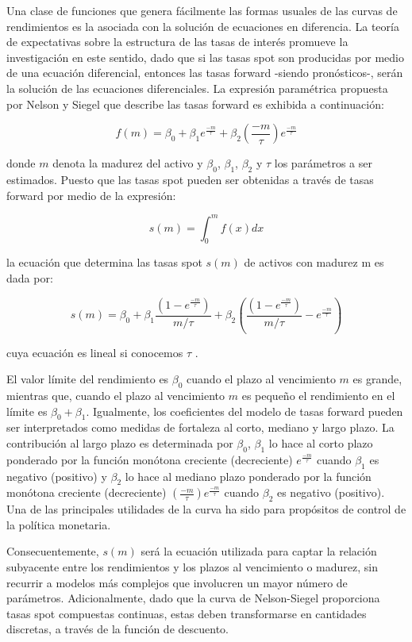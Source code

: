 \documentclass[
  12pt,
]{krantz}
\begin{document}
Una clase de funciones que genera fácilmente las formas usuales de las
curvas de rendimientos es la asociada con la solución de ecuaciones en
diferencia. La teoría de expectativas sobre la estructura de las tasas de
interés promueve la investigación en este sentido, dado que si las tasas
spot son producidas por medio de una ecuación diferencial, entonces las
tasas forward -siendo pronósticos-, serán la solución de las ecuaciones
diferenciales. La expresión paramétrica propuesta por Nelson y Siegel
que describe las tasas forward es exhibida a continuación:

\[\displaystyle{f(m) = \beta_{0} + \beta_{1} e^{\frac{-m}{\tau}} +\beta_{2} \left(\frac{-m}{\tau}\right)e^{\frac{-m}{\tau}}}\]

donde \(m\) denota la madurez del activo y \(\beta_{0}\), \(\beta_{1}\), \(\beta_{2}\) y \(\tau\) los parámetros a ser
estimados. Puesto que las tasas spot pueden ser obtenidas a través de tasas
forward por medio de la expresión:

\[\displaystyle{s(m) = \int_{0}^{m}f(x)dx}\]

la ecuación que determina las tasas spot \(s(m)\) de activos con madurez m es dada por:

\[\displaystyle{s(m) = \beta_{0}+ \beta_{1}\frac{\left(1-e^\frac{-m}{\tau}\right)}{m/\tau} + \beta_{2} \left(\frac{\left(1-e^\frac{-m}{\tau}\right)}{m/\tau} -  e^\frac{-m}{\tau}\right)}\]

cuya ecuación es lineal si conocemos \(\tau\) .

El valor límite del rendimiento es \(\beta_{0}\) cuando el plazo al vencimiento \(m\) es grande, mientras que, cuando el plazo al vencimiento \(m\) es pequeño el
rendimiento en el límite es \(\beta_{0}+\beta_{1}\). Igualmente, los coeficientes del
modelo de tasas forward pueden ser interpretados como medidas de
fortaleza al corto, mediano y largo plazo. La contribución al largo plazo
es determinada por \(\beta_{0}\), \(\beta_{1}\) lo hace al corto plazo ponderado por la
función monótona creciente (decreciente) \(e^{\frac{-m}{\tau}}\) cuando \(\beta_{1}\) es negativo
(positivo) y \(\beta_{2}\) lo hace al mediano plazo ponderado por la función
monótona creciente (decreciente) \((\frac{-m}{\tau}) e^{\frac{-m}{\tau}}\) cuando \(\beta_{2}\) es negativo
(positivo). Una de las principales utilidades de la curva ha sido para
propósitos de control de la política monetaria.

Consecuentemente, \(s(m)\) será la ecuación utilizada para captar la relación
subyacente entre los rendimientos y los plazos al vencimiento o madurez,
sin recurrir a modelos más complejos que involucren un mayor número
de parámetros. Adicionalmente, dado que la curva de Nelson-Siegel
proporciona tasas spot compuestas continuas, estas deben transformarse
en cantidades discretas, a través de la función de descuento.
\end{document}

